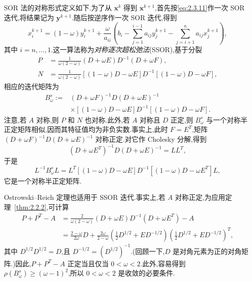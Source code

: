 SOR 法的对称形式定义如下.为了从 \(\boldsymbol{x}^k\) 得到 \(\boldsymbol{x}^{k+1}\),首先按\eqref{eq:2.3.11}作一次 SOR 迭代,将结果记为 \(\boldsymbol{y}^{k+1}\).随后按逆序作一次 SOR 迭代,得到
\begin{equation}\label{eq:2.3.16}
  x_i^{k+1}=(1-\omega)y_i^{k+1}+\frac{\omega}{a_{ii}}
  \left(b_i-\sum_{j=1}^{i-1}a_{ij}y_j^{k+1}-\sum_{j=i+1}^na_{ij}x_j^{k+1}\right),
\end{equation}
其中 \(i=n,\ldots,1\).这一算法称为\emph{对称逐次超松弛法}(SSOR),基于分裂
\begin{equation}\label{eq:2.3.17}
  \begin{aligned}
    P&=\frac1{\omega(2-\omega)}(D+\omega E)D^{-1}(D+\omega F),\\
    N&=\frac1{\omega(2-\omega)}[(1-\omega)D-\omega E]D^{-1}[(1-\omega)D-\omega F],
  \end{aligned}
\end{equation}
相应的迭代矩阵为
\begin{equation}\label{eq:2.3.18}
  \begin{aligned}
    B_\omega^s:={}&(D+\omega F)^{-1}D(D+\omega E)^{-1}\\
      &\times[(1-\omega)D-\omega E]D^{-1}[(1-\omega)D-\omega F].
  \end{aligned}
\end{equation}
注意,若 \(A\) 对称,则 \(P\) 和 \(N\) 也对称.此外,若 \(A\) 对称且 \(D\) 正定,则 \(B_\omega^s\) 与一个对称半正定矩阵相似,因而其特征值均为非负实数.事实上,此时 \(F=E^T\),矩阵 \((D+\omega F)^{-1}D(D+\omega E)^{-1}\) 对称正定.对它作 Cholesky 分解,得到
\[
  (D+\omega E^T)^{-1}D(D+\omega E)^{-1}=LL^T,
\]
于是
\[
  L^{-1}B_\omega^sL
  =L^T[(1-\omega)D-\omega E]D^{-1}[(1-\omega)D-\omega E^T]L,
\]
它是一个对称半正定矩阵.

Ostrowski--Reich 定理也适用于 SSOR 迭代.事实上,若 \(A\) 对称正定,为应用定理~\ref{thm:2.2.2},可计算
\[
  \begin{aligned}
    P+P^T-A
    &={}\frac2{\omega(2-\omega)}(D+\omega E)D^{-1}(D+\omega E^T)-A\\
    &={}\frac{2-\omega}{2\omega}D+
       \frac{2\omega}{2-\omega}
       \left(\frac12D^{1/2}+ED^{-1/2}\right)
       \left(\frac12D^{1/2}+ED^{-1/2}\right)^T,
  \end{aligned}
\]
其中 \(D^{1/2}D^{1/2}=D\),且 \(D^{-1/2}=(D^{1/2})^{-1}\).(回顾一下,\(D\) 是对角元素为正的对角矩阵.)因此,\(P+P^T-A\) 正定当且仅当 \(0<\omega<2\).此外,容易得到 \(\rho(B_\omega^s)\ge(\omega-1)^2\),所以 \(0<\omega<2\) 是收敛的必要条件.

